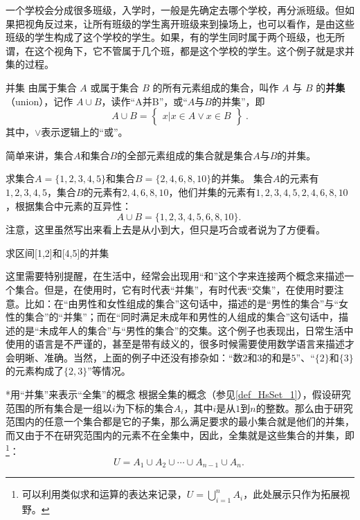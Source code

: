 一个学校会分成很多班级，入学时，一般是先确定去哪个学校，再分派班级。但如果把视角反过来，让所有班级的学生离开班级来到操场上，也可以看作，是由这些班级的学生构成了这个学校的学生。如果，有的学生同时属于两个班级，也无所谓，在这个视角下，它不管属于几个班，都是这个学校的学生。这个例子就是求并集的过程。

\begin{definition}{并集}
由属于集合 $A$ 或属于集合 $B$ 的所有元素组成的集合，叫作 $A$ 与 $B$ 的\textbf{并集}（union），记作 $A\cup B$，读作“A并B”，或“$A$与$B$的并集”，即
\begin{equation}
A\cup B = \begin{Bmatrix}x|x\in A \lor x\in B\end{Bmatrix}~.
\end{equation}
其中，$\lor$表示逻辑上的“或”。
\end{definition}

简单来讲，集合$A$和集合$B$的全部元素组成的集合就是集合$A$与$B$的并集。
\begin{example}{求集合$A=\{1,2,3,4,5\}$和集合$B=\{2,4,6,8,10\}$的并集。}
集合$A$的元素有$1,2,3,4,5$，集合$B$的元素有$2,4,6,8,10$，他们并集的元素有$1,2,3,4,5,2,4,6,8,10$，根据集合中元素的互异性：
$$
A\cup B=\{1,2,3,4,5,6,8,10\}.~
$$
注意，这里虽然写出来看上去是从小到大，但只是巧合或者说为了方便看。
\end{example}
\begin{exercise}{求区间[1,2]和[4,5]的并集}

\end{exercise}
这里需要特别提醒，在生活中，经常会出现用“和”这个字来连接两个概念来描述一个集合。但是，在使用时，它有时代表“并集”，有时代表“交集”，在使用时要注意。比如：在“由男性和女性组成的集合”这句话中，描述的是“男性的集合”与“女性的集合”的“并集”；而在“同时满足未成年和男性的人组成的集合”这句话中，描述的是“未成年人的集合”与“男性的集合”的交集。这个例子也表现出，日常生活中使用的语言是不严谨的，甚至是带有歧义的，很多时候需要使用数学语言来描述才会明晰、准确。当然，上面的例子中还没有掺杂如：“数$2$和$3$的和是$5$”、“$\{2\}$和$\{3\}$的元素构成了$\{2,3\}$”等情况。

\begin{example}{*用“并集”来表示“全集”的概念}
根据全集的概念（参见\autoref{def_HsSet_1}），假设研究范围的所有集合是一组以$i$为下标的集合$A_i$，其中$i$是从$1$到$n$的整数。那么由于研究范围内的任意一个集合都是它的子集，那么满足要求的最小集合就是他们的并集，而又由于不在研究范围内的元素不在全集中，因此，全集就是这些集合的并集，即\footnote{可以利用类似求和运算的表达来记录，$\displaystyle U=\bigcup_{i=1}^n A_i$，此处展示只作为拓展视野。}：
$$
U=A_1\cup A_2\cup \cdots \cup A_{n-1}\cup A_n.~
$$
\end{example}
